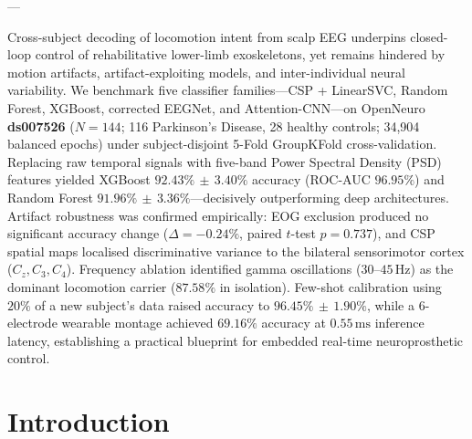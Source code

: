 \documentclass[11pt,a4paper]{article}
\begin{document}
---{\fontsize{10pt}{13.5pt}\selectfont Cross-subject decoding of locomotion intent from scalp EEG underpins closed-loop control of rehabilitative lower-limb exoskeletons, yet remains hindered by motion artifacts, artifact-exploiting models, and inter-individual neural variability. We benchmark five classifier families---CSP + LinearSVC, Random Forest, XGBoost, corrected EEGNet, and Attention-CNN---on OpenNeuro \textbf{ds007526} ($N=144$; 116 Parkinson's Disease, 28 healthy controls; 34,904 balanced epochs) under subject-disjoint 5-Fold GroupKFold cross-validation. Replacing raw temporal signals with five-band Power Spectral Density (PSD) features yielded XGBoost $92.43\%\,{\pm}\,3.40\%$ accuracy (ROC-AUC $96.95\%$) and Random Forest $91.96\%\,{\pm}\,3.36\%$---decisively outperforming deep architectures. Artifact robustness was confirmed empirically: EOG exclusion produced no significant accuracy change ($\Delta{=}{-}0.24\%$, paired $t$-test $p{=}0.737$), and CSP spatial maps localised discriminative variance to the bilateral sensorimotor cortex ($C_z, C_3, C_4$). Frequency ablation identified gamma oscillations ($30\text{--}45\,\text{Hz}$) as the dominant locomotion carrier ($87.58\%$ in isolation). Few-shot calibration using $20\%$ of a new subject's data raised accuracy to $96.45\%\,{\pm}\,1.90\%$, while a 6-electrode wearable montage achieved $69.16\%$ accuracy at $0.55\,\text{ms}$ inference latency, establishing a practical blueprint for embedded real-time neuroprosthetic control.\par}

\vspace{8pt}

\vspace{14pt}

\section{Introduction}
\label{sec:introduction}
\end{document}
